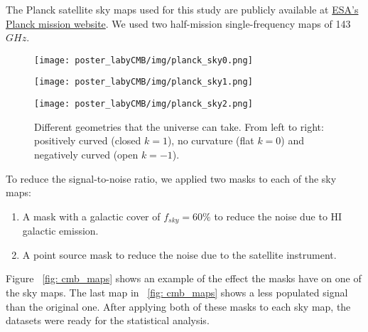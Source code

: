 The Planck satellite sky maps used for this study are publicly available at \href{http://pla.esac.esa.int/pla/#maps}{ESA's Planck mission website}. We used two half-mission single-frequency maps of 143 $GHz$.

\vspace{0.5em}
\begin{figure}
	\begin{minipage}{0.3\textwidth}
		\centering\texttt{[image: poster\_labyCMB/img/planck\_sky0.png]}
	\end{minipage}
	\hspace{1em}
	\begin{minipage}{0.3\textwidth}
	    \captionsetup{width=2\textwidth}
		\centering\texttt{[image: poster\_labyCMB/img/planck\_sky1.png]}
		\hspace{14em}\caption{Different geometries that the universe can take. From left to right: positively curved (closed $k=1$), no curvature (flat $k=0$) and negatively curved (open $k=-1$).}
		\label{fig:geometries}
	\end{minipage}
	\hspace{1em}
	\begin{minipage}{0.3\textwidth} 
		\centering\texttt{[image: poster\_labyCMB/img/planck\_sky2.png]}
	\end{minipage}
\end{figure}

To reduce the signal-to-noise ratio, we applied two masks to each of the sky maps:

\begin{enumerate}

	\item A mask with a galactic cover of $f_{sky} = 60 \%$ to reduce the noise due to HI galactic emission.
	
 	\item A point source mask to reduce the noise due to the satellite instrument.
 	
\end{enumerate}

Figure ~\ref{fig: cmb_maps} shows an example of the effect the masks have on one of the sky maps. The last map in ~\ref{fig: cmb_maps} shows a less populated signal than the original one. After applying both of these masks to each sky map, the datasets were ready for the statistical analysis.



